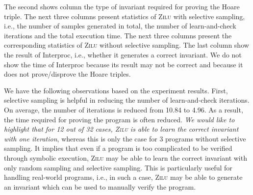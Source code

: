 The second shows column the type of invariant required for proving the Hoare triple. The next three columns present statistics of \textsc{Zilu} with selective sampling, i.e., the number of samples generated in total, the number of learn-and-check iterations and the total execution time. The next three columns present the corresponding statistics of \textsc{Zilu} without selective sampling.
The last column show the result of Interproc, i.e., whether it generates a correct invariant. We do not show the time of Interproc because its result may not be correct and because it does not prove/disprove the Hoare triples.

We have the following observations based on the experiment results. First, selective sampling is helpful in reducing the number of learn-and-check iterations.
On average, the number of iterations is reduced from 10.84 to 4.96. As a result, the time required for proving the program is often reduced.
\emph{We would like to highlight that for 12 out of 32 cases, \textsc{Zilu} is able to learn the correct invariant with one iteration}, whereas this is only the case for 3 programs without selective sampling. It implies that even if a program is too complicated to be verified through symbolic execution, \textsc{Zilu} may be able to learn the correct invariant with only random sampling and selective sampling.
This is particularly useful for handling real-world programs, i.e., in such a case, \textsc{Zilu} may be able to generate an invariant which can be used to manually verify the program.

